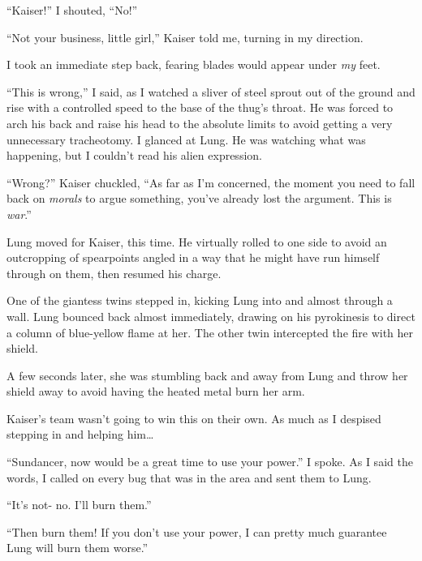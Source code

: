 ``Kaiser!'' I shouted, ``No!''



``Not your business, little girl,'' Kaiser told me, turning in my direction.



I took an immediate step back, fearing blades would appear under \emph{my} feet.



``This is wrong,'' I said, as I watched a sliver of steel sprout out of the ground and rise with a controlled speed to the base of the thug's throat.  He was forced to arch his back and raise his head to the absolute limits to avoid getting a very unnecessary tracheotomy.  I glanced at Lung.  He was watching what was happening, but I couldn't read his alien expression.



``Wrong?'' Kaiser chuckled, ``As far as I'm concerned, the moment you need to fall back on \emph{morals }to argue something, you've already lost the argument.  This is \emph{war}.''



Lung moved for Kaiser, this time.  He virtually rolled to one side to avoid an outcropping of spearpoints angled in a way that he might have run himself through on them, then resumed his charge.



One of the giantess twins stepped in, kicking Lung into and almost through a wall.  Lung bounced back almost immediately, drawing on his pyrokinesis to direct a column of blue-yellow flame at her.  The other twin intercepted the fire with her shield.



A few seconds later, she was stumbling back and away from Lung and throw her shield away to avoid having the heated metal burn her arm.



Kaiser's team wasn't going to win this on their own.  As much as I despised stepping in and helping him\ldots



``Sundancer, now would be a great time to use your power.''  I spoke.  As I said the words, I called on every bug that was in the area and sent them to Lung.



``It's not- no.  I'll burn them.''



``Then burn them!  If you don't use your power, I can pretty much guarantee Lung will burn them worse.''



